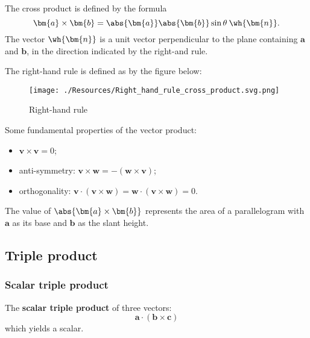 \documentclass[12pt, a4paper]{article}
\begin{document}
\begin{theorem}
    The cross product is defined by the formula 
    \[\bm{a}\times\bm{b} =\abs{\bm{a}}\abs{\bm{b}}\sin\theta \:\wh{\bm{n}}.\]
    The vector \(\wh{\bm{n}}\) is a unit vector perpendicular to the plane containing \(\bm{a}\) and \(\bm{b}\), in the direction indicated by the right-and rule.
\end{theorem}


\begin{definition}
    The right-hand rule is defined as by the figure below:
    \begin{figure}[H]
        \caption{Right-hand rule}
        \label{fig:RH rule}
        \begin{center}
            \texttt{[image: ./Resources/Right\_hand\_rule\_cross\_product.svg.png]}
            
        \end{center}
    \end{figure}
\end{definition}

\begin{mdthm}
    Some fundamental properties of the vector product:
    \begin{itemize}
        \item \(\bm{v}\times \bm{v} =0\);
        \item anti-symmetry: \(\bm{v}\times\bm{w} = -(\bm{w}\times \bm{v})\);
        \item orthogonality: \(\bm{v} \cdot (\bm{v} \times \bm{w}) = \bm{w}\cdot (\bm{v}\times \bm{w})=0.\)
    \end{itemize}
\end{mdthm}

\begin{theorem}
    The value of \(\abs{\bm{a}\times \bm{b}}\) represents the area of a parallelogram with \(\bm{a}\) as its base and \(\bm{b}\) as the slant height.
\end{theorem}

\subsection{Triple product}

\subsubsection{Scalar triple product}

\begin{definition}
    The \textbf{scalar triple product} of three vectors: 
    \[\bm{a}\cdot (\bm{b} \times\bm{c})\]
    which yields a scalar.
\end{definition}
\end{document}
